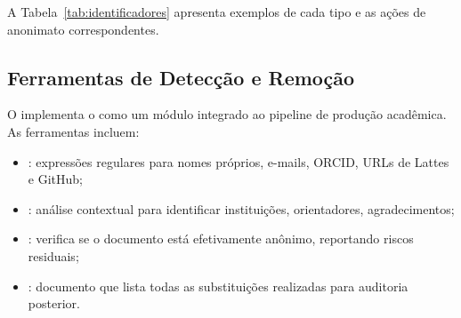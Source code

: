 A Tabela~\ref{tab:identificadores} apresenta exemplos de cada tipo e as ações
de anonimato correspondentes.

\begin{table}[htb]
\centering
\caption{Identificadores diretos e indiretos e ações de anonimato}
\label{tab:identificadores}
\small
\end{table}

\subsection{Ferramentas de Detecção e Remoção}

O \opencodeeco{} implementa o  como um
módulo integrado ao pipeline de produção acadêmica. As ferramentas incluem:

\begin{itemize}
\item {}: expressões regulares
      para nomes próprios, e-mails, ORCID, URLs de Lattes e GitHub;
\item {}: análise contextual
      para identificar instituições, orientadores, agradecimentos;
\item {}: verifica se o documento está
      efetivamente anônimo, reportando riscos residuais;
\item {}: documento que lista todas as
      substituições realizadas para auditoria posterior.
\end{itemize}

